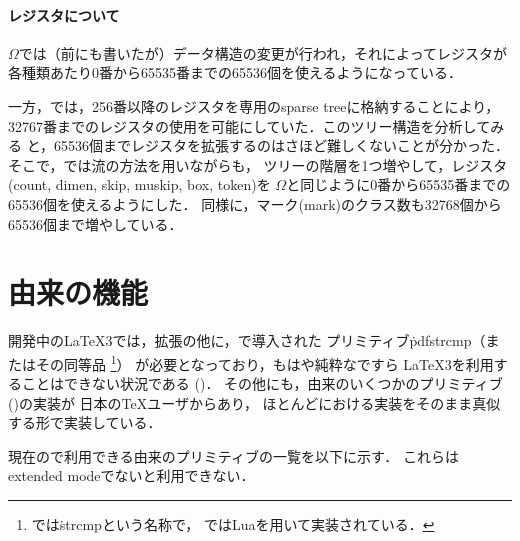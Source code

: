 \documentclass[a4paper,11pt,nomag]{jsarticle}
\newcommand{\OMEGA}{\texorpdfstring{$\Omega$}{Ω}}
\begin{document}
\paragraph{レジスタについて}
\OMEGA では（前にも書いたが）データ構造の変更が行われ，それによってレジスタが
各種類あたり0番から65535番までの65536個を使えるようになっている．

一方，\eTeX では，256番以降のレジスタを専用のsparse treeに格納することにより，
32767番までのレジスタの使用を可能にしていた．このツリー構造を分析してみる
と，65536個までレジスタを拡張するのはさほど難しくないことが分かった．
そこで，\epTeX では\eTeX 流の方法を用いながらも，
ツリーの階層を1つ増やして，レジスタ(count, dimen, skip, muskip, box, token)を
\OMEGA と同じように0番から65535番までの65536個を使えるようにした．
同様に，マーク(mark)のクラス数も32768個から65536個まで増やしている．

\section{由来の機能}
開発中の\LaTeX 3では，\eTeX 拡張の他に，で導入された
プリミティブ\.{pdfstrcmp}（またはその同等品%
\footnote{では\.{strcmp}という名称で，
ではLuaを用いて実装されている．}）%
が必要となっており，もはや純粋な\eTeX ですら
\LaTeX 3を利用することはできない状況である (\cite{expl31,expl32,expl33})．
その他にも，由来のいくつかのプリミティブ(\cite{pdftexman})の実装が
日本の\TeX ユーザからあり，
ほとんどにおける実装をそのまま真似する形で実装している．

現在の\epTeX で利用できる由来のプリミティブの一覧を以下に示す．
これらはextended modeでないと利用できない．
\end{document}
